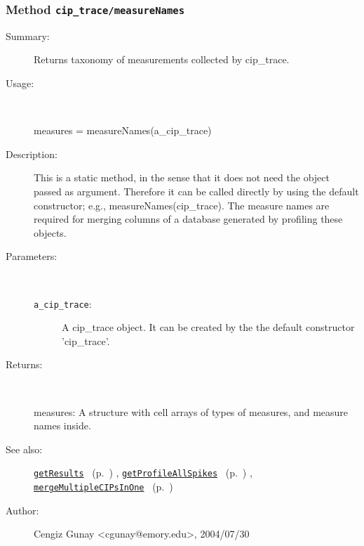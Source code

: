 \subsubsection[Method \texttt{measureNames}]{Method \texttt{cip\_trace/measureNames}}%
%
\label{ref_cip_trace__measureNames}%
\hypertarget{ref_cip_trace__measureNames}{}%
\begin{description}
\item[Summary:]Returns taxonomy of measurements collected by cip\_trace.
%
\item[Usage:]~%
\begin{lyxcode}%
measures = measureNames(a\_cip\_trace)
%
\end{lyxcode}%
%
\item[Description:]%
This is a static method, in the sense that it does not need the object passed as argument.
 Therefore it can be called directly by using the default constructor; e.g., measureNames(cip\_trace).
 The measure names are required for merging columns of a database generated by profiling these objects.
\item[Parameters:]~
\begin{description}%
\item[\texttt{a\_cip\_trace}:]
 A cip\_trace object. It can be created by the the default constructor 'cip\_trace'.
\end{description}%
%
\item[Returns:
]~

	measures: A structure with cell arrays of types of measures, and measure names inside.
%
%
\item[See also:]%
\hyperlink{ref_getResults}{\texttt{getResults}}%
\ (p.~\pageref{ref_getResults})%
%
, \hyperlink{ref_getProfileAllSpikes}{\texttt{getProfileAllSpikes}}%
\ (p.~\pageref{ref_getProfileAllSpikes})%
%
, \hyperlink{ref_mergeMultipleCIPsInOne}{\texttt{mergeMultipleCIPsInOne}}%
\ (p.~\pageref{ref_mergeMultipleCIPsInOne})%
%
%
\item[Author:]%
Cengiz Gunay <cgunay@emory.edu>, 2004/07/30
%
\end{description}
\methodline%
